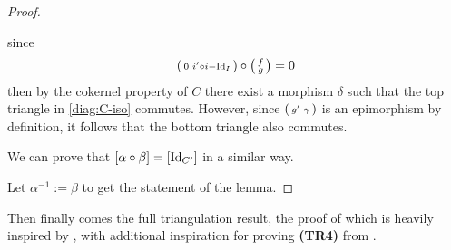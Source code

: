 \begin{proof}
\begin{diagramlabel}[\label{diag:C-iso}]
    \end{diagramlabel}
    since
    \[
        \begin{psmallmatrix}
            0 & i' \circ i - \operatorname{Id}_I
        \end{psmallmatrix}
        \circ
        \begin{psmallmatrix}
            f \\
            g
        \end{psmallmatrix}
        = 0
    \]
    then by the cokernel property of \( C \) there exist a morphism \( \delta \) such that the top triangle in \autoref{diag:C-iso} commutes. However, since \( 
        \begin{psmallmatrix}
            g' & \gamma
        \end{psmallmatrix}
    \) is an epimorphism by definition, it follows that the bottom triangle also commutes.

    We can prove that \( [\alpha \circ \beta] = [\operatorname{Id}_{C'}] \) in a similar way.

    Let \( \alpha^{-1} := \beta \) to get the statement of the lemma.
\end{proof}

Then finally comes the full triangulation result, the proof of which is heavily inspired by \cite[First theorem in Chapter 1, Subsection 2.6]{Happel_1988}, with additional inspiration for proving {\bf (TR4)} from \cite[Theorem 4.18]{Johan_Bachelor}.



